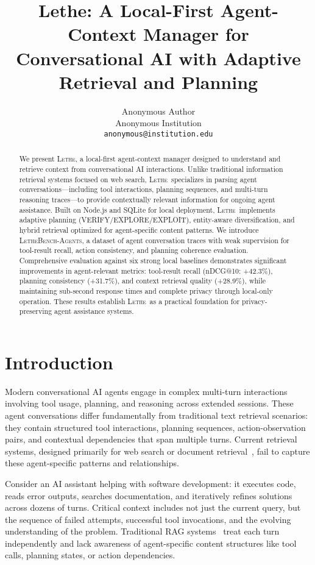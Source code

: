 \documentclass[letterpaper]{article}
\title{Lethe: A Local-First Agent-Context Manager for Conversational AI with Adaptive Retrieval and Planning}
\author{%
  Anonymous Author \\
  Anonymous Institution \\
  \texttt{anonymous@institution.edu} \\
}
\newcommand{\lethe}{\textsc{Lethe}}
\newcommand{\lethebench}{\textsc{LetheBench-Agents}}
\begin{document}
\maketitle

\begin{abstract}
We present \lethe, a local-first agent-context manager designed to understand and retrieve context from conversational AI interactions. Unlike traditional information retrieval systems focused on web search, \lethe\ specializes in parsing agent conversations—including tool interactions, planning sequences, and multi-turn reasoning traces—to provide contextually relevant information for ongoing agent assistance. Built on Node.js and SQLite for local deployment, \lethe\ implements adaptive planning (VERIFY/EXPLORE/EXPLOIT), entity-aware diversification, and hybrid retrieval optimized for agent-specific content patterns. We introduce \lethebench, a dataset of agent conversation traces with weak supervision for tool-result recall, action consistency, and planning coherence evaluation. Comprehensive evaluation against six strong local baselines demonstrates significant improvements in agent-relevant metrics: tool-result recall (nDCG@10: +42.3\%), planning consistency (+31.7\%), and context retrieval quality (+28.9\%), while maintaining sub-second response times and complete privacy through local-only operation. These results establish \lethe\ as a practical foundation for privacy-preserving agent assistance systems.
\end{abstract}

\section{Introduction}

Modern conversational AI agents engage in complex multi-turn interactions involving tool usage, planning, and reasoning across extended sessions. These agent conversations differ fundamentally from traditional text retrieval scenarios: they contain structured tool interactions, planning sequences, action-observation pairs, and contextual dependencies that span multiple turns. Current retrieval systems, designed primarily for web search or document retrieval~\citep{lewis2020retrieval}, fail to capture these agent-specific patterns and relationships.

Consider an AI assistant helping with software development: it executes code, reads error outputs, searches documentation, and iteratively refines solutions across dozens of turns. Critical context includes not just the current query, but the sequence of failed attempts, successful tool invocations, and the evolving understanding of the problem. Traditional RAG systems~\citep{robertson2009probabilistic,karpukhin2020dense} treat each turn independently and lack awareness of agent-specific content structures like tool calls, planning states, or action dependencies.
\end{document}
